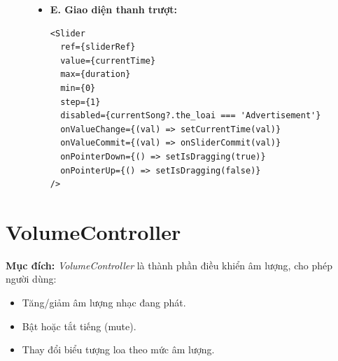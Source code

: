 \begin{figure}[H]
\begin{itemize}
  \item \textbf{E. Giao diện thanh trượt:}
\begin{verbatim}
<Slider
  ref={sliderRef}
  value={currentTime}
  max={duration}
  min={0}
  step={1}
  disabled={currentSong?.the_loai === 'Advertisement'}
  onValueChange={(val) => setCurrentTime(val)}
  onValueCommit={(val) => onSliderCommit(val)}
  onPointerDown={() => setIsDragging(true)}
  onPointerUp={() => setIsDragging(false)}
/>
\end{verbatim}
\end{itemize}

\end{figure}

\vspace{1cm}

\section{VolumeController}

\textbf{Mục đích:} \textit{VolumeController} là thành phần điều khiển âm lượng, cho phép người dùng:
\begin{itemize}
  \item Tăng/giảm âm lượng nhạc đang phát.
  \item Bật hoặc tắt tiếng (mute).
  \item Thay đổi biểu tượng loa theo mức âm lượng.
\end{itemize}


